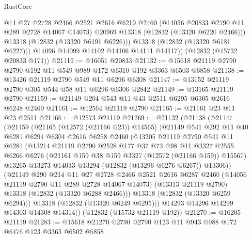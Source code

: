 \begin{lexlean}{RustCore}
\begin{coremodule}
              @11
              @27
              @2728
              @2466
              @2521
              @2616
              @6219
              @2460
              (@14056 @20833 @2790 @11 @289 @2728 @14067 @14073)
              @20969
              @13318
              (@12832 (@13320 @6220 @2466)))
            @13318
            (@12832 (@13320 @6191 @6226)))
          @13318
          (@12832 (@13320 @6181 @6227)))
        @14096
        @14099
        @14102
        @14106
        @14111
        @14117))
    (@12832 (@15732 @20833 @171))
@21119 := @16051 @20833
@21132 := @15618 @21119 @2790 @2790 @192 @11 @549 @989 @172 @6310 @192 @3363 @6503 @6858
@21138 := @13426 @21119 @2790 @549 @11 @6296 @6308
@21147 := @13152 @21119 @2790 @305 @544 @58 @11 @6296 @6306 @2842
@21149 := @13165 @21119 @2790
@21159 := @21149 @204 @543 @11 @43 @2511 @6295 @6305 @2616 @6248 @2460
@21161 := @12564 @21119 @2790
@21165 := @21161 @23 @11 @23 @2511
@21166 := @12573 @21119
@21269 := @21132
    (@21138
      (@21147
        (@21159
          (@21165 (@12572 (@21166 @23)) @14565)
          (@21149
            @541
            @292
            @11
            @40
            @6281
            @6294
            @6304
            @2616
            @6258
            @2460
            (@13205
              @21119
              @2790
              @541
              @11
              @6281
              (@13214
                @21119
                @2790
                @2528
                @177
                @37
                @73
                @98
                @11
                @3327
                @2555
                @6266
                @6276
                (@21161 @159 @38 @159 @3327 (@12572 (@21166 @159)) @15567)
                @13265
                @13273
                @14033
                @13294
                (@12832 (@13296 @6276 @6267))
                @13306))
            (@21149
              @290
              @214
              @11
              @27
              @2728
              @2466
              @2521
              @2616
              @6287
              @2460
              (@14056 @21119 @2790 @11 @289 @2728 @14067 @14073)
              (@13313 @21119 @2790)
              @13318
              (@12832 (@13320 @6288 @2466)))
            @13318
            (@12832 (@13320 @6259 @6294)))
          @13318
          (@12832 (@13320 @6249 @6295)))
        @14293
        @14296
        @14299
        @14303
        @14308
        @14314))
    (@12832 (@15732 @21119 @192))
@21270 := @16205 @21119
@21283 := @15618 @21270 @2790 @2790 @123 @11 @943 @988 @172 @6476 @123 @3363 @6502 @6858

\end{coremodule}
\end{lexlean}
